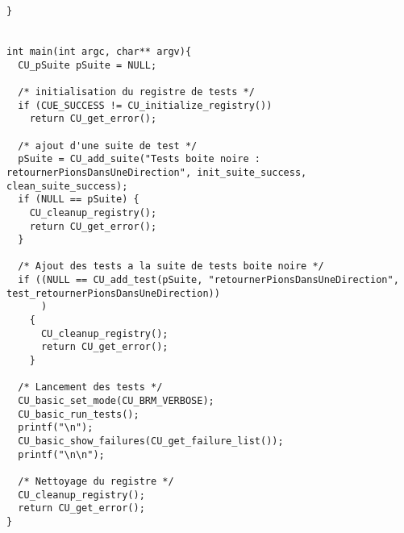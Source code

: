 \begin{lstlisting}
}


int main(int argc, char** argv){
  CU_pSuite pSuite = NULL;

  /* initialisation du registre de tests */
  if (CUE_SUCCESS != CU_initialize_registry())
    return CU_get_error();

  /* ajout d'une suite de test */
  pSuite = CU_add_suite("Tests boite noire : retournerPionsDansUneDirection", init_suite_success, clean_suite_success);
  if (NULL == pSuite) {
    CU_cleanup_registry();
    return CU_get_error();
  }

  /* Ajout des tests a la suite de tests boite noire */
  if ((NULL == CU_add_test(pSuite, "retournerPionsDansUneDirection", test_retournerPionsDansUneDirection))
      )
    {
      CU_cleanup_registry();
      return CU_get_error();
    }

  /* Lancement des tests */
  CU_basic_set_mode(CU_BRM_VERBOSE);
  CU_basic_run_tests();
  printf("\n");
  CU_basic_show_failures(CU_get_failure_list());
  printf("\n\n");

  /* Nettoyage du registre */
  CU_cleanup_registry();
  return CU_get_error();
}
\end{lstlisting}

